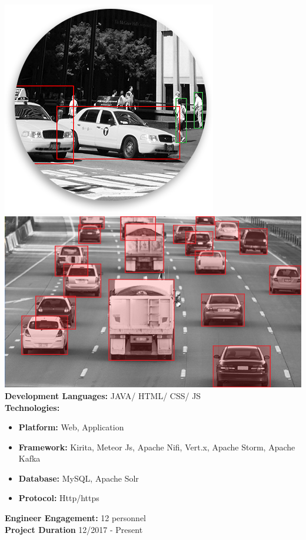 \documentclass[]{friggeri-cv}
\begin{document}
\begin{entrylist}
\entry
{}
{}
{}
	{		
		\includegraphics[scale=0.3]{img/labeling_img_14.png} \hspace{1cm}
		\includegraphics[scale=0.25]{img/labeling_img_5_1.png}\\
		
		 \textbf{Development Languages:} JAVA/ HTML/ CSS/ JS~\\
	 \textbf{Technologies:}~
			\begin{itemize}
				\item \textbf{Platform:}  Web, Application
				\item \textbf{Framework:} Kirita, Meteor Js, Apache Nifi,  Vert.x, Apache Storm, Apache Kafka  
				\item \textbf{Database:} MySQL, Apache Solr
				\item \textbf{Protocol:} Http/https
			\end{itemize}
	 \textbf{Engineer Engagement:} 12 personnel\\
	 \textbf{Project Duration} 12/2017 - Present~
	}
\end{entrylist}
\end{document}
